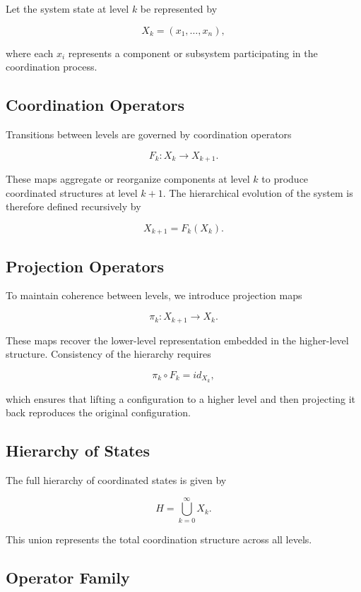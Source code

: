 \documentclass[12pt]{article}
\begin{document}
Let the system state at level $k$ be represented by

\[
X_k = (x_1,\dots,x_n),
\]

where each $x_i$ represents a component or subsystem participating in the coordination process.

\subsection{Coordination Operators}

Transitions between levels are governed by coordination operators

\[
F_k : X_k \rightarrow X_{k+1}.
\]

These maps aggregate or reorganize components at level $k$ to produce coordinated structures at level $k+1$. The hierarchical evolution of the system is therefore defined recursively by

\[
X_{k+1} = F_k(X_k).
\]

\subsection{Projection Operators}

To maintain coherence between levels, we introduce projection maps

\[
\pi_k : X_{k+1} \rightarrow X_k.
\]

These maps recover the lower-level representation embedded in the higher-level structure. Consistency of the hierarchy requires

\[
\pi_k \circ F_k = id_{X_k},
\]

which ensures that lifting a configuration to a higher level and then projecting it back reproduces the original configuration.

\subsection{Hierarchy of States}

The full hierarchy of coordinated states is given by

\[
H = \bigcup_{k=0}^{\infty} X_k .
\]

This union represents the total coordination structure across all levels.

\subsection{Operator Family}
\end{document}
